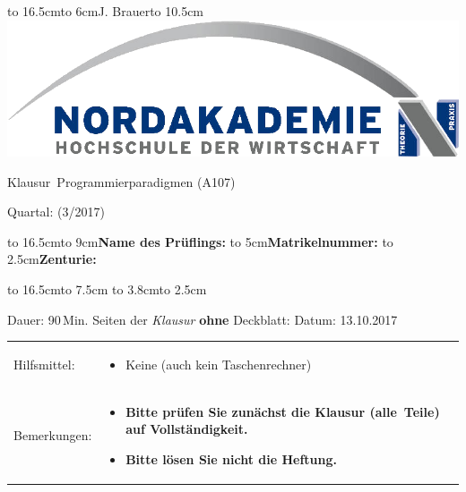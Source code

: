\documentclass[12pt]{exam}
\newcommand{\klausurart}{Klausur}
\newcommand{\thema}{Programmierparadigmen (A107)}
\newcommand{\klausurtag}{13.10.2017}
\newcommand{\quartal}{(3/2017)}
\newcommand{\klausurdauer}{90}
\newcommand{\hilfsmittel}{Keine (auch kein Taschenrechner)}
\newcommand{\dozent}{J. Brauer}
\begin{document}
\begin{coverpages}

\hbox to 16.5cm{\hbox to 6cm{\vbox{\dozent}}\hfill\hbox to 10.5cm{\hfill\includegraphics[scale=0.4]{hochs.png}}}



\begin{center}
\Large \bf{\klausurart\ \thema 

Quartal: \quartal}
\end{center}
\vspace{0.3cm}
\hbox to 16.5cm{\hbox to 9cm{\textbf{Name des Prüflings:}  \hfill}
\vspace{0.6cm}
\hbox to 5cm{\textbf{Matrikelnummer: }  \hfil}\hbox to 2.5cm{\textbf{Zenturie:}  \hfil}}

\hbox to 16.5cm{\hbox to 7.5cm{ \hrulefill}\hfil\hbox to 3.8cm{\hrulefill}\hfil\hbox to 2.5cm{ \hrulefill}}

\vspace{0.3cm}
Dauer: \klausurdauer \,Min. \hfill Seiten der \emph{Klausur} \textbf{ohne} Deckblatt: \numpages
\hfill Datum: \klausurtag

\vspace{0.7cm}

\begin{tabular}{p{6cm}p{9.5cm}}

Hilfsmittel: &
\begin{itemize}
  \item \hilfsmittel
\end{itemize}\\

Bemerkungen: &
\begin{itemize}
  \item \textbf{Bitte prüfen Sie zunächst die Klausur \mbox{(alle Teile)} auf Vollständigkeit.}
  \item \textbf{Bitte lösen Sie nicht die Heftung.}
\end{itemize}\\
\end{tabular}


\end{coverpages}
\end{document}
